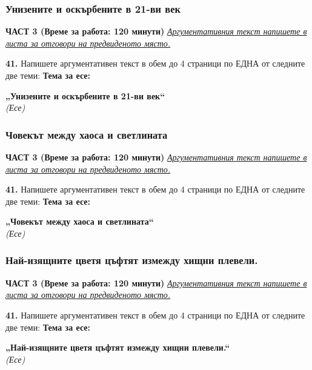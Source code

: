 \documentclass[12pt,a4paper]{article}
\begin{document}
\subsubsection{Унизените и оскърбените в 21-ви век}
\vspace{0.5cm}
\begin{center}
\textbf{ЧАСТ 3 (Време за работа: 120 минути)}
\vspace{0.2cm}
{\textit{\underline{Аргументативния текст напишете в листа за отговори на предвиденото място.}}}
\vspace{0.1cm}
\end{center}
\textbf{41.} Напишете аргументативен текст в обем до 4 страници по ЕДНА от следните две теми:
\vspace{0.2cm}
\textbf{Тема за есе:}
\vspace{0.1cm}
\begin{center}
\textbf{„Унизените и оскърбените в 21-ви век“}
\\
\textit{(Есе)}
\end{center}

\subsubsection{Човекът между хаоса и светлината}
\vspace{0.5cm}
\begin{center}
\textbf{ЧАСТ 3 (Време за работа: 120 минути)}
\vspace{0.2cm}
{\textit{\underline{Аргументативния текст напишете в листа за отговори на предвиденото място.}}}
\vspace{0.1cm}
\end{center}
\textbf{41.} Напишете аргументативен текст в обем до 4 страници по ЕДНА от следните две теми:
\vspace{0.2cm}
\textbf{Тема за есе:}
\vspace{0.1cm}
\begin{center}
\textbf{„Човекът между хаоса и светлината“}
\\
\textit{(Есе)}
\end{center}

\subsubsection{Най-изящните цветя цъфтят измежду хищни плевели.}
\vspace{0.5cm}
\begin{center}
\textbf{ЧАСТ 3 (Време за работа: 120 минути)}
\vspace{0.2cm}
{\textit{\underline{Аргументативния текст напишете в листа за отговори на предвиденото място.}}}
\vspace{0.1cm}
\end{center}
\textbf{41.} Напишете аргументативен текст в обем до 4 страници по ЕДНА от следните две теми:
\vspace{0.2cm}
\textbf{Тема за есе:}
\vspace{0.1cm}
\begin{center}
\textbf{„Най-изящните цветя цъфтят измежду хищни плевели.“}
\\
\textit{(Есе)}
\end{center}
\end{document}

